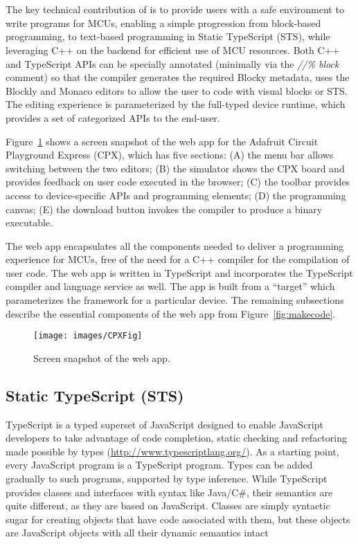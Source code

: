 \section{\MC}
\label{sec:makecode}
The key technical contribution of \MC is to provide users with a safe environment to write programs for MCUs, enabling a simple progression from block-based
programming, to text-based programming in Static TypeScript (STS),
while leveraging C++ on the backend for efficient use of MCU resources.
Both C++ and TypeScript APIs can be specially annotated (minimally via
the \emph{//\% block} comment) so that the \MC compiler generates the required
Blocky metadata,
\MC uses the Blockly and Monaco editors to allow the user to code with
visual blocks or STS. The editing experience is parameterized by the full-typed device
runtime, which provides a set of categorized APIs to the end-user.

Figure~\ref{fig:screenSnap} shows a screen snapshot of the \MC web app for the Adafruit Circuit Playground Express (CPX), which has five sections:
(A) the menu bar allows switching between the two editors;
(B) the simulator shows the CPX board and provides feedback on user code executed in the browser;
(C) the toolbar provides access to device-specific APIs and programming elements;
(D) the programming canvas;
(E) the download button invokes the compiler to produce a binary executable.

The web app encapsulates all the components needed to deliver a programming experience
for MCUs, free of the need for a C++ compiler for the compilation of user code.
The web app is written in TypeScript and incorporates the TypeScript compiler and
language service as well.
The app is built from a \MC ``target''
which parameterizes the \MC framework for a particular device.
The remaining subsections describe the essential components of the web app
from Figure~\ref{fig:makecode}.


\begin{figure}[t]
    \texttt{[image: images/CPXFig]}
\caption{\label{fig:screenSnap}Screen snapshot of the \MC web app.}
\end{figure}

\subsection{Static TypeScript (STS)}

TypeScript is a typed superset of JavaScript designed to enable JavaScript developers to take advantage of code
completion, static checking and refactoring made possible by types (\url{http://www.typescriptlang.org/}).
As a starting point, every JavaScript program is a TypeScript program.  Types can be added gradually to such programs, supported by type inference. While TypeScript provides classes and interfaces with syntax like
Java/C\#, their semantics are quite different, as they are based on JavaScript. Classes are simply syntactic sugar for creating objects that have code associated with them, but these objects are
JavaScript objects with all their dynamic semantics intact

